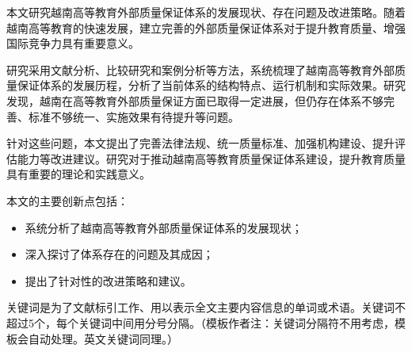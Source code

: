 


\makeatother




\begin{cabstract}
本文研究越南高等教育外部质量保证体系的发展现状、存在问题及改进策略。随着越南高等教育的快速发展，建立完善的外部质量保证体系对于提升教育质量、增强国际竞争力具有重要意义。

研究采用文献分析、比较研究和案例分析等方法，系统梳理了越南高等教育外部质量保证体系的发展历程，分析了当前体系的结构特点、运行机制和实际效果。研究发现，越南在高等教育外部质量保证方面已取得一定进展，但仍存在体系不够完善、标准不够统一、实施效果有待提升等问题。

针对这些问题，本文提出了完善法律法规、统一质量标准、加强机构建设、提升评估能力等改进建议。研究对于推动越南高等教育质量保证体系建设，提升教育质量具有重要的理论和实践意义。

  本文的主要创新点包括：
  \begin{itemize}[$\bullet$]
    \item 系统分析了越南高等教育外部质量保证体系的发展现状；
    \item 深入探讨了体系存在的问题及其成因；
    \item 提出了针对性的改进策略和建议。
  \end{itemize}

  关键词是为了文献标引工作、用以表示全文主要内容信息的单词或术语。关键词不超过5个，每个关键词中间用分号分隔。（模板作者注：关键词分隔符不用考虑，模板会自动处理。英文关键词同理。）
\end{cabstract}



